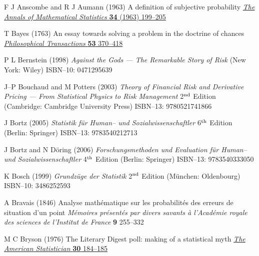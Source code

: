 \begin{thebibliography}{99}

F J Anscombe and R J Aumann
(1963) A definition of subjective probability
\href{http://www.jstor.org/stable/2991295}{\textit{The Annals of 
Mathematical Statistics} \textbf{34} (1963) 199--205}

T Bayes
(1763) An essay towards solving a problem in the doctrine of 
chances
\href{http://dx.doi.org/10.1098/rstl.1763.0053}{\textit{Philosophical
Transactions} \textbf{53} 370--418}

P L Bernstein
(1998) \textit{Against the Gods --- The Remarkable Story of Risk}
(New York: Wiley) ISBN--10: 0471295639

J--P Bouchaud and M Potters
(2003) \textit{Theory of Financial Risk and Derivative Pricing
--- From Statistical Physics to Risk Management}
2$^{\rm nd}$ Edition (Cambridge: Cambridge University Press)
ISBN--13: 9780521741866

J Bortz
(2005) \textit{Statistik f\"ur Human-- und Sozialwissenschaftler}
6$^{\rm th}$ Edition (Berlin: Springer) ISBN--13: 9783540212713

J Bortz and N D\"{o}ring
(2006) \textit{Forschungsmethoden und Evaluation f\"ur Human-- und 
Sozialwissenschaftler}
4$^{\rm th}$ Edition (Berlin: Springer) ISBN--13: 9783540333050

K Bosch
(1999) \textit{Grundz\"uge der Statistik}
2$^{\rm nd}$ Edition (M\"unchen: Oldenbourg) ISBN--10: 3486252593

A Bravais
(1846) Analyse math\'{e}matique sur les probabilit\'{e}s des 
erreurs de situation d'un point
\textit{M\'{e}moires pr\'{e}sent\'{e}s par divers savants \`{a} 
l'Acad\'{e}mie royale des sciences de l'Institut de France}
\textbf{9} 255--332

M C Bryson
(1976) The Literary Digest poll: making of a statistical myth
\href{http://dx.doi.org/10.1080/00031305.1976.10479173}{\textit{The 
American Statistician} \textbf{30} 184--185}


\end{thebibliography}
